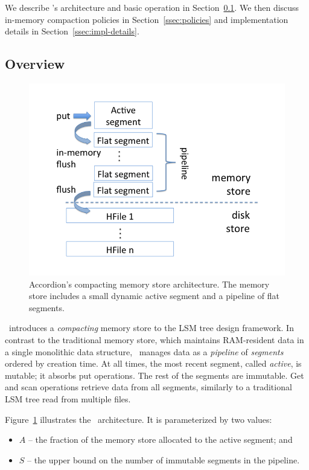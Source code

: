 
We describe  \sys's architecture and basic operation in Section~\ref{ssec:overview}.
We then discuss in-memory compaction policies  in  Section~\ref{ssec:policies}
and implementation details in Section~\ref{ssec:impl-details}. 

\subsection{Overview} \label{ssec:overview}

\begin{figure}[tbh]
\center
\includegraphics[width=\columnwidth, trim={0 1cm 0 1cm}, clip]{Accordion} 
\caption{Accordion's compacting memory store architecture. The memory store includes a small dynamic active segment 
and a pipeline of flat segments. }
\label{fig:accordion}
\end{figure}

\sys\ introduces a \emph{compacting} memory store to the LSM tree design framework. In contrast to the traditional memory store, 
which maintains RAM-resident data in a single monolithic data structure, \sys\ manages data as a \emph{pipeline} of 
\emph{segments} ordered by creation time. At all times, the most recent segment, called \emph{active}, is mutable;
it absorbs  put operations. The rest of the segments are immutable. Get and scan operations retrieve data from all  segments, 
 similarly to a traditional LSM tree read from multiple files. 
 
 Figure~\ref{fig:accordion} illustrates the \sys\ architecture. It is parameterized by two values:
\begin{itemize}
\item  $A$ -- the fraction of the memory store allocated to the active segment; and 
\item $S$ -- the upper bound on the number of immutable segments in the pipeline. 
\end{itemize}

